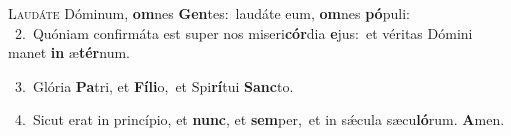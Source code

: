 \lettrine{\initial\textcolor{\initialcolor}{L}}{audáte} Dóminum, \textbf{om}\-nes \textbf{Gen}\-tes:~\star laudáte eum, \textbf{om}\-nes \textbf{pó}\-puli:\\
{\numbfont\textcolor{\numbcolor}{~2.}}~Quóniam confirmáta est super nos miseri\-\textbf{cór}\-dia \textbf{e}\-jus:~\star et véritas Dómini manet \textbf{in} æ\-\textbf{tér}\-num.\par
{\numbfont\textcolor{\numbcolor}{~3.}}~Glória \textbf{Pa}\-tri, et \textbf{Fí}\-\textbf{li}o,~\star et Spi\-\textbf{rí}\-tui \textbf{Sanc}\-to.\par
{\numbfont\textcolor{\numbcolor}{~4.}}~Sicut erat in princípio, et \textbf{nunc}\-, et \textbf{sem}\-per,~\star et in sǽcula sæcu\-\textbf{ló}\-rum. \textbf{A}\-men.\par
